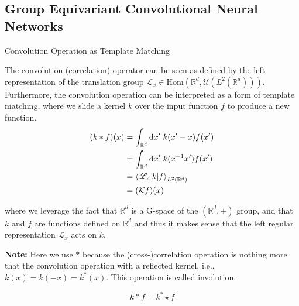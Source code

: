 \documentclass[9pt,dvipsnames]{beamer}
\begin{document}
\subsection{Group Equivariant Convolutional Neural Networks}
\begin{frame}{Convolution Operation as Template Matching}

	The convolution (correlation) operator can be seen as defined by the left representation of the translation group $\mathscr{L}_x \in \mathrm{Hom}(\mathbb{R}^d, \mathcal{U}(L^2(\mathbb{R}^d)))$. Furthermore, the convolution operation can be interpreted as a form of template matching, where we slide a kernel $k$ over the input function $f$ to produce a new function.
	\begin{equation}
		\begin{split}
			(k * f)(x) & = \int_{\mathbb{R}^d} \dd x' \; k(x'-x) f(x')       \\
			           & = \int_{\mathbb{R}^d} \dd x' \; k(x^{-1}x') f(x')   \\
			           & = \braket{\mathscr{L}_x \;k}{f}_{L^2(\mathbb{R}^d)} \\
			           & = (\mathcal{K} f)(x)
		\end{split}
	\end{equation}

	where we leverage the fact that $\mathbb{R}^d$ is a G-space of the $(\mathbb{R}^d, +)$ group, and that $k$ and $f$ are functions defined on $\mathbb{R}^d$ and thus it makes sense that the left regular representation $\mathscr{L}_x$ acts on $k$.

	\sectionvspace

	{\color{red} {\bf Note:} Here we use $*$ because the (cross-)correlation operation is nothing more that the convolution operation with a reflected kernel, i.e., $k(x) = k(-x) =  k^{*}(x)$. This operation is called involution.}

	\begin{equation*}
		k * f = k^{*} \star f
	\end{equation*}

\end{frame}
\end{document}
